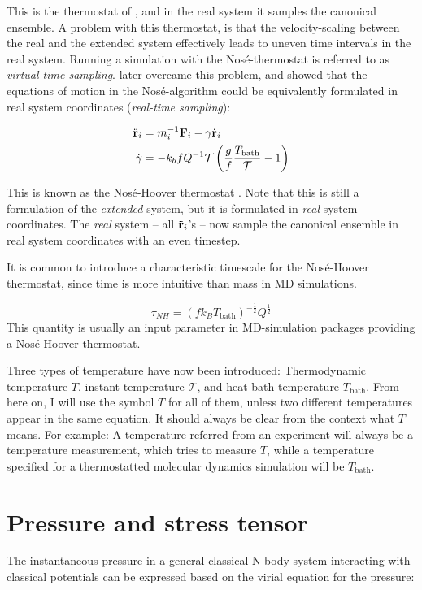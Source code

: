 This is the thermostat of \citet{Nose1984}, and in the real system it samples the canonical ensemble. A problem with this thermostat, is that the velocity-scaling between the real and the extended system effectively leads to uneven time intervals in the real system. Running a simulation with the Nosé-thermostat is referred to as \emph{virtual-time sampling}. \citet{Hoover1985} later overcame this problem, and showed that the equations of motion in the Nosé-algorithm could be equivalently formulated in real system coordinates (\emph{real-time sampling}):

\begin{align}
	\ddot {\mathbf{r}}_i & = m_i^{-1} \mathbf{F}_i -\gamma \dot{\mathbf{r}}_i \\
	\dot \gamma & = -k_b f Q^{-1} \mathcal{T} \left(\frac{g}{f} \frac{T_{\text{bath}}}{\mathcal{T}}-1\right)
\end{align}

This is known as the Nosé-Hoover thermostat \cite{Hoover1985}. Note that this is still a formulation of the \emph{extended} system, but it is formulated in \emph{real} system coordinates. The \emph{real} system -- all $\ddot{\mathbf{r}}_i$'s -- now sample the canonical ensemble in real system coordinates with an even timestep.

It is common to introduce a characteristic timescale for the Nosé-Hoover thermostat, since time is more intuitive than mass in MD simulations. 

\begin{equation}
	\tau_{NH} = (fk_B T_{\text{bath}})^{-\frac{1}{2}} Q^{\frac{1}{2}}
\end{equation}
This quantity is usually an input parameter in MD-simulation packages providing a Nosé-Hoover thermostat.

Three types of temperature have now been introduced: Thermodynamic temperature $T$, instant temperature $\mathcal{T}$, and heat bath temperature $T_{\text{bath}}$. From here on, I will use the symbol $T$ for all of them, unless two different temperatures appear in the same equation. It should always be clear from the context what $T$ means. For example: A temperature referred from an experiment will always be a temperature measurement, which tries to measure $T$, while a temperature specified for a thermostatted molecular dynamics simulation will be $T_{\text{bath}}$.

\section{Pressure and stress tensor}
The instantaneous pressure in a general classical N-body system interacting with classical potentials can be expressed based on the virial equation for the pressure:

